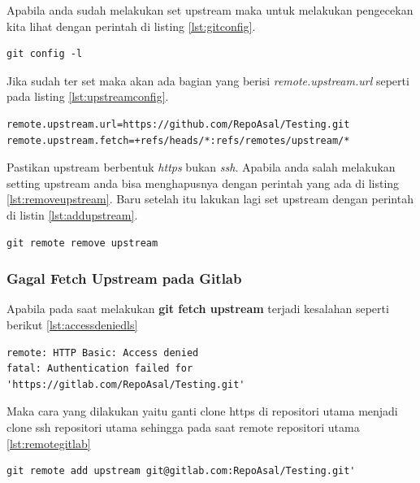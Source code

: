 Apabila anda sudah melakukan set upstream maka untuk melakukan pengecekan kita lihat dengan perintah di listing \ref{lst:gitconfig}.
\begin{lstlisting}[caption=Melihat konfigurasi git di repo komputer kita,label={lst:gitconfig}]
git config -l
\end{lstlisting}
Jika sudah ter set maka akan ada bagian yang berisi \textit{remote.upstream.url} seperti pada listing \ref{lst:upstreamconfig}.
\begin{lstlisting}[caption=Hasil perintah \textit{git config -l},label={lst:upstreamconfig}]
remote.upstream.url=https://github.com/RepoAsal/Testing.git
remote.upstream.fetch=+refs/heads/*:refs/remotes/upstream/*
\end{lstlisting}
Pastikan upstream berbentuk \textit{https} bukan \textit{ssh}. Apabila anda salah melakukan setting upstream anda bisa menghapusnya dengan perintah yang ada di listing \ref{lst:removeupstream}. Baru setelah itu lakukan lagi set upstream dengan perintah di listin \ref{lst:addupstream}.
\begin{lstlisting}[caption=Perintah menghapus upstream yang salah,label={lst:removeupstream}]
git remote remove upstream
\end{lstlisting}

\subsubsection{Gagal Fetch Upstream pada Gitlab}
Apabila pada saat melakukan \textbf{git fetch upstream} terjadi kesalahan seperti berikut \ref{lst:accessdeniedls}
\begin{lstlisting}[caption=Access Denied,label={lst:accessdeniedls}]
remote: HTTP Basic: Access denied
fatal: Authentication failed for 'https://gitlab.com/RepoAsal/Testing.git'
\end{lstlisting}

Maka cara yang dilakukan yaitu ganti clone https di repositori utama menjadi clone ssh repositori utama sehingga pada saat remote repositori utama \ref{lst:remotegitlab}

\begin{lstlisting}[caption=perintah remote repo utama,label={lst:remotegitlab}]
git remote add upstream git@gitlab.com:RepoAsal/Testing.git'
\end{lstlisting}

